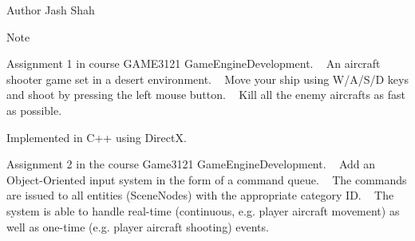 \begin{DoxyAuthor}{Author}
Jash Shah
\end{DoxyAuthor}
\begin{DoxyNote}{Note}

\end{DoxyNote}
Assignment 1 in course GAME3121 Game\+Engine\+Development. ~\newline
 An aircraft shooter game set in a desert environment. ~\newline
 Move your ship using W/\+A/\+S/D keys and shoot by pressing the left mouse button. ~\newline
 Kill all the enemy aircrafts as fast as possible. ~\newline


Implemented in C++ using DirectX.

Assignment 2 in the course Game3121 Game\+Engine\+Development. ~\newline
 Add an Object-\/\+Oriented input system in the form of a command queue. ~\newline
 The commands are issued to all entities (Scene\+Nodes) with the appropriate category ID. ~\newline
 The system is able to handle real-\/time (continuous, e.\+g. player aircraft movement) as well as one-\/time (e.\+g. player aircraft shooting) events. ~\newline
 